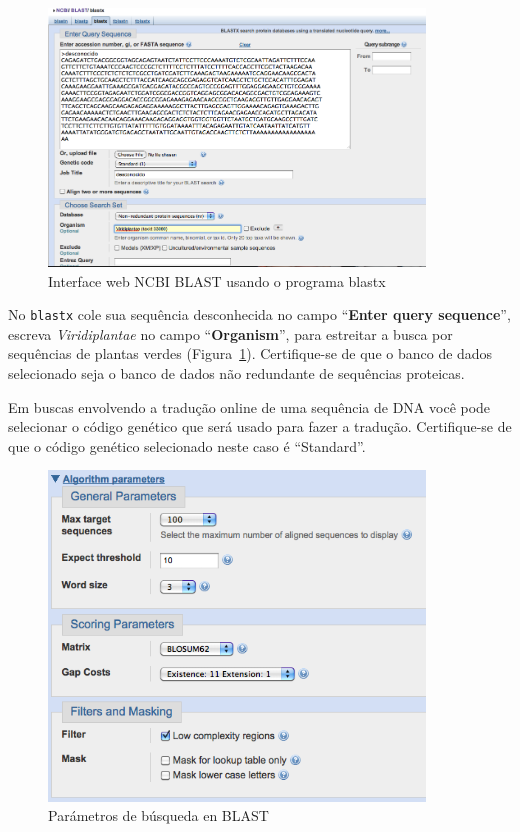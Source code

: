 \documentclass[letter,11pt]{book}
\begin{document}
\begin{figure}[h!]
\centering
   \includegraphics[width=10cm]{Figs/blastx_input.png}
  \caption{\label{blastx_input}Interface web NCBI BLAST usando o programa blastx}
\end{figure}

No \Verb+blastx+ cole sua sequência desconhecida no campo ``\textbf{Enter query sequence}'', escreva \textit{Viridiplantae} no campo ``\textbf{Organism}'', para estreitar a busca por sequências de plantas verdes (Figura~\ref{blastx_input}). Certifique-se de que o banco de dados selecionado seja o banco de dados não redundante de sequências proteicas.

Em buscas envolvendo a tradução online de uma sequência de DNA você pode selecionar o código genético que será usado para fazer a tradução. Certifique-se de que o código genético selecionado neste caso é ``Standard''.

\begin{figure}[h!]
\centering
   \includegraphics[width=10cm]{Figs/blastx_parameters.png}
  \caption{\label{blastx_parameters}Parámetros de búsqueda en BLAST}
\end{figure}
\end{document}
